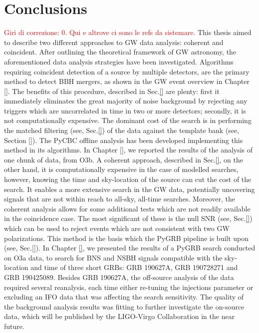 \documentclass[binding=0.6cm, LaM]{sapthesis}
\newcommand{\fpg}[1]{\textcolor{red}{#1} }
\begin{document}
\chapter*{Conclusions}
\fpg{Giri di correzione: 0.}%
\fpg{Qui e altrove ci sono le refs da sistemare.}
This thesis aimed to describe two different approaches to GW data analysis: coherent and coincident.
	After outlining the theoretical framework of GW astronomy,
	the aforementioned data analysis strategies have been investigated. 
	Algorithms requiring coincident detection of a source by multiple detectors,
	are the primary method to detect BBH mergers, 
	as shown in the GW event overview in Chapter \ref{}.
	The benefits of this procedure, described in Sec.\ref{} are plenty: 
	first it immediately eliminates the great majority of noise background 
	by rejecting any triggers which are uncorrelated in time in two or more detectors; 
	secondly, it is not computationally expensive. 
	The dominant cost of the search is in performing the matched filtering (see, Sec.\ref{}) 
	of the data against the template bank (see, Section \ref{}).
	The {\ttfamily PyCBC} offline analysis has been developed implementing this method in its algorithms. 
	In Chapter \ref{}, we reported the results of the analysis of one chunk of data,  from O3b.
	A coherent approach, described in Sec.\ref{}, on the other hand, 
	it is computationally expensive in the case of modelled searches,
	however, knowing the time and sky-location of the source can cut the cost of the search.
	It enables a more extensive search in the GW data, potentially uncovering signals 
	that are not within reach to all-sky, all-time searches.
	Moreover, the coherent analysis allows for some additional tests 
	which are not readily available in the coincidence case. 
	The most significant of these is the null SNR (see, Sec.\ref{}) which can be used to reject events which are 
	not consistent with two GW polarizations. 
	This method is the  basis which the  {\ttfamily PyGRB}  pipeline is built upon (see, Sec.\ref{}).
	In Chapter \ref{}, we presented the results of a {\ttfamily PyGRB} search conducted on O3a data,
	to search for BNS and NSBH signals compatible with the sky-location and time of three short GRBs:
	GRB 190627A, GRB 190728271 and GRB 190425089.
	Besides GRB 190627A, the off-source analysis of the data required several reanalysis,
	each time either re-tuning the injections parameter or excluding an IFO data that was affecting the search sensitivity.
	The quality of the background analysis results was fitting to further investigate
	the on-source data, which will be published by the LIGO-Virgo Collaboration in the near future.
\end{document}
